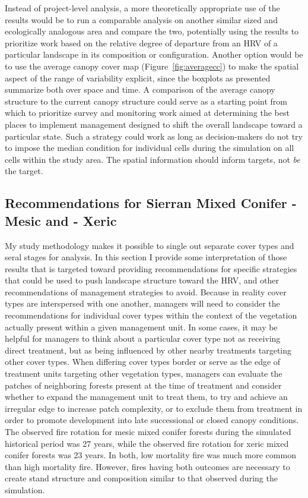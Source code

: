 Instead of project-level analysis, a more theoretically appropriate use of the results would be to run a comparable analysis on another similar sized and ecologically analogous area and compare the two, potentially using the results to prioritize work based on the relative degree of departure from an HRV of a particular landscape in its composition or configuration. Another option would be to use the average canopy cover map (Figure~\ref{fig:averagecc}) to make the spatial aspect of the range of variability explicit, since the boxplots as presented summarize both over space and time. A comparison of the average canopy structure to the current canopy structure could serve as a starting point from which to prioritize survey and monitoring work aimed at determining the best places to implement management designed to shift the overall landscape toward a particular state. Such a strategy could work as long as decision-makers do not try to impose the median condition for individual cells during the simulation on all cells within the study area. The spatial information should inform targets, not \emph{be} the target.

\subsection{Recommendations for Sierran Mixed Conifer - Mesic and - Xeric}
My study methodology makes it possible to single out separate cover types and seral stages for analysis. In this section I provide some interpretation of those results that is targeted toward providing recommendations for specific strategies that could be used to push landscape structure toward the HRV, and other recommendations of management strategies to avoid. Because in reality cover types are interspersed with one another, managers will need to consider the recommendations for individual cover types within the context of the vegetation actually present within a given management unit. In some cases, it may be helpful for managers to think about a particular cover type not as receiving direct treatment, but as being influenced by other nearby treatments targeting other cover types. When differing cover types border or serve as the edge of treatment units targeting other vegetation types, managers can evaluate the patches of neighboring forests present at the time of treatment and consider whether to expand the management unit to treat them, to try and achieve an irregular edge to increase patch complexity, or to exclude them from treatment in order to promote development into late successional or closed canopy conditions. The observed fire rotation for mesic mixed conifer forests during the simulated historical period was 27 years, while the observed fire rotation for xeric mixed conifer forests was 23 years. In both, low mortality fire was much more common than high mortality fire. However, fires having both outcomes are necessary to create stand structure and composition similar to that observed during the simulation. 

